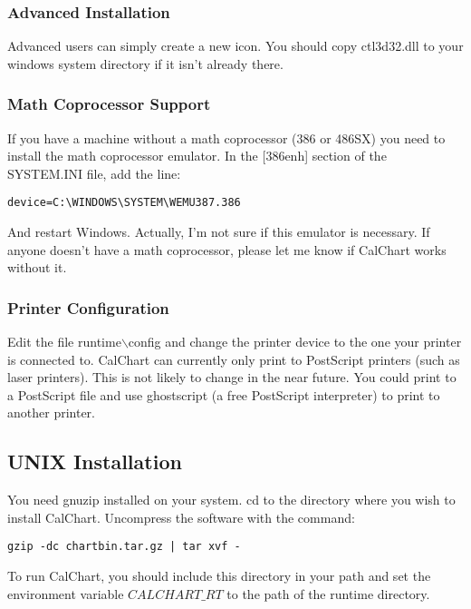 \subsubsection{Advanced Installation}\label{advinstall}

Advanced users can simply create a new icon.  You should copy
ctl3d32.dll to your windows system directory if it isn't already there.

\subsubsection{Math Coprocessor Support}\label{mathcop}

If you have a machine without a math coprocessor (386 or 486SX) you need
to install the math coprocessor emulator.  In the [386enh] section of
the SYSTEM.INI file, add the line:

\begin{verbatim}
device=C:\WINDOWS\SYSTEM\WEMU387.386
\end{verbatim}

And restart Windows.  Actually, I'm not sure if this emulator is necessary.
If anyone doesn't have a math coprocessor, please let me know if
CalChart works without it.

\subsubsection{Printer Configuration}\label{winprinter}

Edit the file runtime$\backslash$config and change the printer device to the
one your printer is connected to.  CalChart can currently only print to
PostScript printers (such as laser printers).  This is not likely to
change in the near future.  You could print to a PostScript file and use
ghostscript (a free PostScript interpreter) to print to another
printer.

\subsection{UNIX Installation}\label{unixinstall}

You need gnuzip installed on your system.  cd to the directory where you
wish to install CalChart.  Uncompress the software with the command:

\begin{verbatim}
gzip -dc chartbin.tar.gz | tar xvf -
\end{verbatim}

To run CalChart, you should include this directory in your path and set
the environment variable $CALCHART\_RT$ to the path of the runtime
directory.

